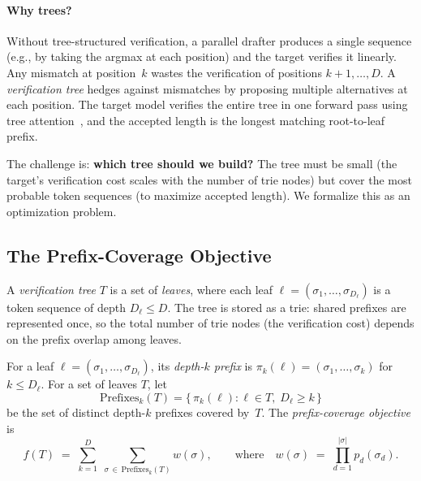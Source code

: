 \paragraph{Why trees?}
Without tree-structured verification, a parallel drafter produces a
single sequence (e.g., by taking the argmax at each position) and the
target verifies it linearly.  Any mismatch at position~$k$ wastes the
verification of positions $k{+}1, \dots, D$.  A \emph{verification tree}
hedges against mismatches by proposing multiple alternatives at each
position.  The target model verifies the entire tree in one forward pass
using tree attention~\citep{miao2024specinfer,cai2024medusa}, and the
accepted length is the longest matching root-to-leaf prefix.

The challenge is: \textbf{which tree should we build?}  The tree must be
small (the target's verification cost scales with the number of trie
nodes) but cover the most probable token sequences (to maximize accepted
length).  We formalize this as an optimization problem.

\subsection{The Prefix-Coverage Objective}
\label{sec:objective}

\begin{definition}
A \emph{verification tree} $T$ is a set of \emph{leaves}, where each
leaf $\ell = (\sigma_1, \dots, \sigma_{D_\ell})$ is a token sequence of
depth $D_\ell \leq D$.  The tree is stored as a trie: shared prefixes
are represented once, so the total number of trie nodes (the
verification cost) depends on the prefix overlap among leaves.
\end{definition}

\begin{definition}
\label{def:objective}
For a leaf $\ell = (\sigma_1, \dots, \sigma_{D_\ell})$, its
\emph{depth-$k$ prefix} is $\pi_k(\ell) = (\sigma_1, \dots, \sigma_k)$
for $k \leq D_\ell$.  For a set of leaves $T$, let
\[
  \mathrm{Prefixes}_k(T)
  = \bigl\{\, \pi_k(\ell) : \ell \in T,\; D_\ell \geq k \,\bigr\}
\]
be the set of distinct depth-$k$ prefixes covered by~$T$.  The
\emph{prefix-coverage objective} is
\begin{equation}
\label{eq:objective}
  f(T)
  \;=\; \sum_{k=1}^{D}\;\sum_{\sigma \,\in\, \mathrm{Prefixes}_k(T)}
        w(\sigma),
  \qquad\text{where}\quad
  w(\sigma)
  \;=\; \prod_{d=1}^{|\sigma|} p_d(\sigma_d).
\end{equation}
\end{definition}

